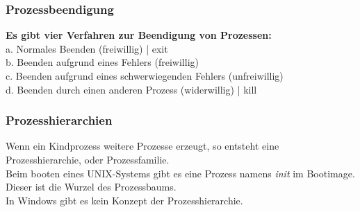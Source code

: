 \documentclass[12pt,a4paper]{univention}
\begin{document}
\subsubsection{Prozessbeendigung}
\textbf{Es gibt vier Verfahren zur Beendigung von Prozessen:}\\
a. Normales Beenden (freiwillig) | exit \\
b. Beenden aufgrund eines Fehlers (freiwillig)\\
c. Beenden aufgrund eines schwerwiegenden Fehlers (unfreiwillig)\\
d. Beenden durch einen anderen Prozess (widerwillig) | kill \\
\subsubsection{Prozesshierarchien}
Wenn ein Kindprozess weitere Prozesse erzeugt, so entsteht eine Prozesshierarchie, oder Prozessfamilie.\\
Beim booten eines UNIX-Systems gibt es eine Prozess namens \textit{init} im Bootimage. Dieser ist die Wurzel des Prozessbaums.\\
In Windows gibt es kein Konzept der Prozesshierarchie.
\end{document}
